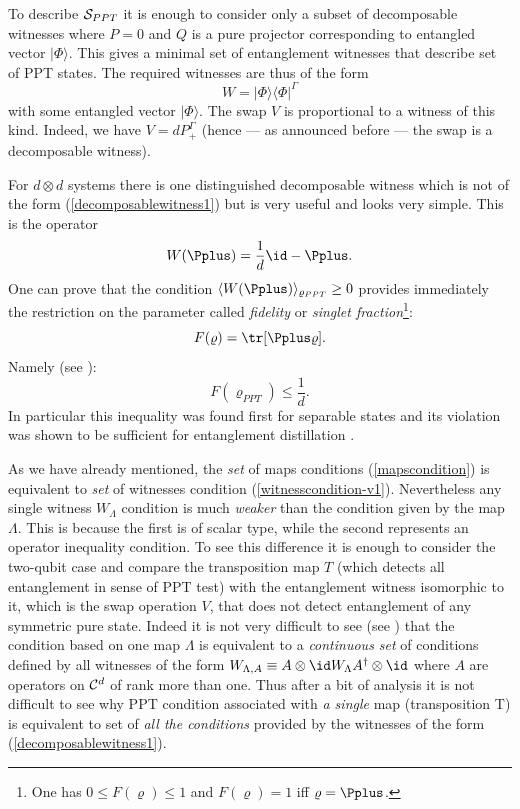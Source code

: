 \documentclass[rmp,12pt,preprint]{revtex4-2}
\begin{document}
To describe ${\cal S}_{PPT}$ it is enough to consider only a subset of
decomposable witnesses where $P=0$ and $Q$ is a pure projector
corresponding to entangled vector $|\Phi\rangle$. This gives a minimal
set of entanglement witnesses that describe set of PPT states. The
required witnesses are thus of the form
\begin{equation}
W=|\Phi \rangle \langle \Phi|^{\Gamma}
\label{decomposablewitness1}
\end{equation}
with some entangled vector $|\Phi\rangle$. The swap $V$ is
proportional to a witness of this kind. Indeed, we have $V=d
P_{+}^{\Gamma}$ (hence --- as announced before --- the swap is a
decomposable witness).

For $d \otimes d$ systems there is one distinguished decomposable
witness which is not of the form (\ref{decomposablewitness1}) but is
very useful and looks very simple. This is the operator
\begin{equation}
W(\Pplus)={1\over d}\id-\Pplus.
\end{equation}
One can prove that the condition $\langle W(\Pplus)
\rangle_{\varrho_{PPT}}\geq 0$ provides immediately the restriction on
the parameter called {\it fidelity} or {\it singlet
  fraction}\footnote{ One has $0 \leq F(\varrho) \leq 1$ and
  $F(\varrho)=1$ iff $\varrho=\Pplus$.  }:
\begin{equation}
F(\varrho)={\tr}[\Pplus\varrho].
\end{equation}
Namely (see \cite{Rains2001}):
\begin{equation}
F(\varrho_{PPT}) \leq \frac{1}{d}.
\end{equation}
In particular this inequality was found first for separable states and
its violation was shown to be sufficient for entanglement distillation
\cite{reduction}.

As we have already mentioned, the {\it set} of maps conditions
(\ref{mapscondition}) is equivalent to {\it set} of witnesses
condition (\ref{witnesscondition-v1}). Nevertheless any single witness
$W_\Lambda$ condition is much {\it weaker} than the condition given by
the map $\Lambda$. This is because the first is of scalar type, while
the second represents an operator inequality condition. To see this
difference it is enough to consider the two-qubit case and compare the
transposition map $T$ (which detects all entanglement in sense of PPT
test) with the entanglement witness isomorphic to it, which is the
swap operation $V$, that does not detect entanglement of any symmetric
pure state. Indeed it is not very difficult to see (see \cite{PHAE})
that the condition based on one map $\Lambda$ is equivalent to a {\it
  continuous set} of conditions defined by all witnesses of the form
$W_{\Lambda,A}\equiv A \otimes \id W_{\Lambda}A^{\dagger} \otimes \id$
where $A$ are operators on ${\cal C}^{d}$ of rank more than one. Thus
after a bit of analysis it is not difficult to see why PPT condition
associated with {\it a single} map (transposition T) is equivalent to
set of {\it all the conditions} provided by the witnesses of the form
(\ref{decomposablewitness1}).
\end{document}

